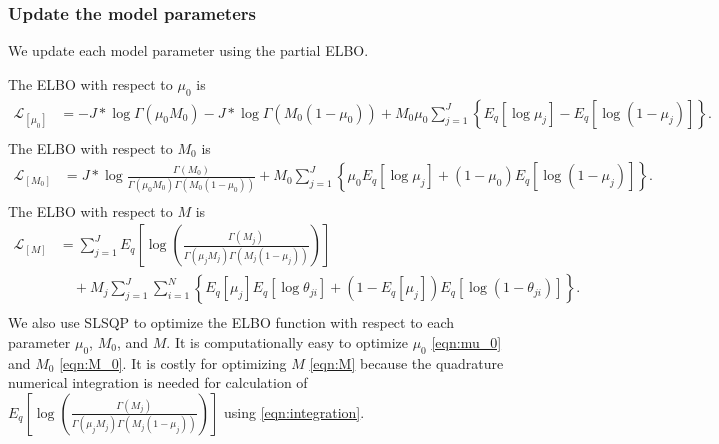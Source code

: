 \documentclass[11pt,reqno]{amsart}
\begin{document}
\subsubsection{Update the model parameters}
We update each model parameter using the partial ELBO.

The ELBO with respect to $ \mu_0 $ is
\begin{equation}\label{eqn:mu_0}
\begin{split}
\mathcal{L}_{[\mu_0]}
&= -J*\log  \Gamma(\mu_0 M_0) - J*\log \Gamma(M_0 (1-\mu_0))
+ M_0\mu_0\sum_{j=1}^{J} \left\lbrace E_q  \left[ \log \mu_j \right]
- E_q  \left[ \log (1 - \mu_j)\right]\right\rbrace . \\
\end{split}
\end{equation}
The ELBO with respect to $ M_0 $ is
\begin{equation}\label{eqn:M_0}
\begin{split}
\mathcal{L}_{[M_0]}
&=J* \log \frac{ \Gamma(M_0) } { \Gamma(\mu_0 M_0) \Gamma(M_0 (1-\mu_0))}
+ M_0 \sum_{j=1}^{J} \left\lbrace \mu_0E_q  \left[ \log \mu_j \right] + ( 1 - \mu_0) E_q  \left[ \log (1 - \mu_j)\right]\right\rbrace.  \\
\end{split}
\end{equation}
The ELBO with respect to $ M $ is
\begin{equation}\label{eqn:M}
\begin{split}
\mathcal{L}_{{[M]}}
&= \sum_{j=1}^{J} E_q  \left[ \log \left( \frac{ \Gamma(M_j) } { \Gamma(\mu_j M_j) \Gamma(M_j (1-\mu_j)) }\right) \right] \\
&\quad + M_j \sum_{j=1}^{J} \sum_{i=1}^{N} \left\lbrace E_q \left[ \mu_j \right] E_q \left[ \log \theta_{ji} \right] + \left( 1 - E_q\left[ \mu_j \right]  \right) E_q\left[ \log \left( 1 - \theta_{ji}\right) \right] \right\rbrace. \\
\end{split}
\end{equation}
We also use SLSQP to optimize the ELBO function with respect to each parameter $\mu_0$, $M_0$, and $M$.
It is computationally easy to optimize $\mu_0$ \eqref{eqn:mu_0} and $M_0$ \eqref{eqn:M_0}.
It is costly for optimizing $M$ \eqref{eqn:M} because the quadrature numerical integration is needed for calculation of $ E_q\left[ \log \left( \frac{ \Gamma(M_j) } { \Gamma(\mu_j M_j) \Gamma(M_j (1-\mu_j)) }\right)\right] $ using \eqref{eqn:integration}.
\end{document}
